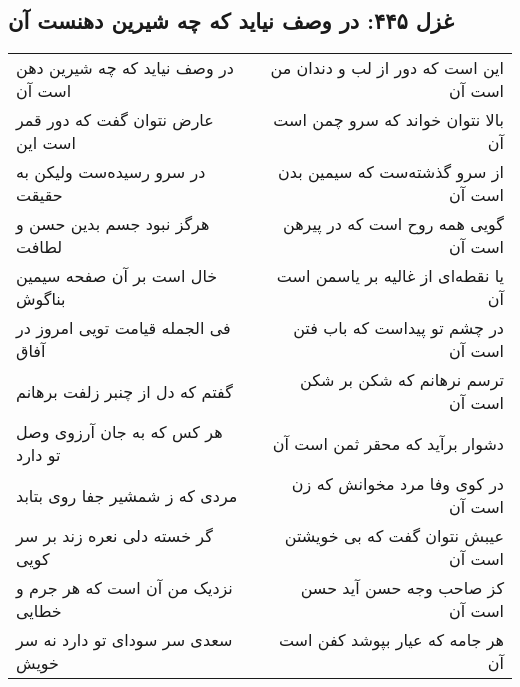 \begin{center}
\section*{غزل ۴۴۵: در وصف نیاید که چه شیرین دهنست آن}
\label{sec:445}
\begin{longtable}{l p{0.5cm} r}
در وصف نیاید که چه شیرین دهن است آن
&&
این است که دور از لب و دندان من است آن
\\
عارض نتوان گفت که دور قمر است این
&&
بالا نتوان خواند که سرو چمن است آن
\\
در سرو رسیده‌ست ولیکن به حقیقت
&&
از سرو گذشته‌ست که سیمین بدن است آن
\\
هرگز نبود جسم بدین حسن و لطافت
&&
گویی همه روح است که در پیرهن است آن
\\
خال است بر آن صفحه سیمین بناگوش
&&
یا نقطه‌ای از غالیه بر یاسمن است آن
\\
فی الجمله قیامت تویی امروز در آفاق
&&
در چشم تو پیداست که باب فتن است آن
\\
گفتم که دل از چنبر زلفت برهانم
&&
ترسم نرهانم که شکن بر شکن است آن
\\
هر کس که به جان آرزوی وصل تو دارد
&&
دشوار برآید که محقر ثمن است آن
\\
مردی که ز شمشیر جفا روی بتابد
&&
در کوی وفا مرد مخوانش که زن است آن
\\
گر خسته دلی نعره زند بر سر کویی
&&
عیبش نتوان گفت که بی خویشتن است آن
\\
نزدیک من آن است که هر جرم و خطایی
&&
کز صاحب وجه حسن آید حسن است آن
\\
سعدی سر سودای تو دارد نه سر خویش
&&
هر جامه که عیار بپوشد کفن است آن
\\
\end{longtable}
\end{center}
